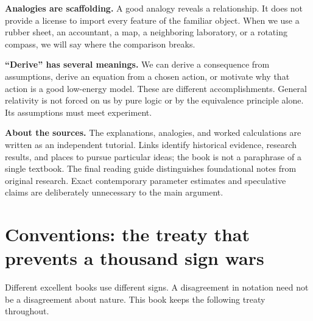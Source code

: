 \documentclass[
  11pt,
  letterpaper,
  oneside,
  openany]{scrbook}
\begin{document}
\endgroup

\textbf{Analogies are scaffolding.} A good analogy reveals a
relationship. It does not provide a license to import every feature of
the familiar object. When we use a rubber sheet, an accountant, a map, a
neighboring laboratory, or a rotating compass, we will say where the
comparison breaks.

\textbf{``Derive'' has several meanings.} We can derive a consequence
from assumptions, derive an equation from a chosen action, or motivate
why that action is a good low-energy model. These are different
accomplishments. General relativity is not forced on us by pure logic or
by the equivalence principle alone. Its assumptions must meet
experiment.

\textbf{About the sources.} The explanations, analogies, and worked
calculations are written as an independent tutorial. Links identify
historical evidence, research results, and places to pursue particular
ideas; the book is not a paraphrase of a single textbook. The final
reading guide distinguishes foundational notes from original research.
Exact contemporary parameter estimates and speculative claims are
deliberately unnecessary to the main argument.

\hypertarget{conventions-the-treaty-that-prevents-a-thousand-sign-wars}{%
\chapter{Conventions: the treaty that prevents a thousand sign
wars}\label{conventions-the-treaty-that-prevents-a-thousand-sign-wars}}

Different excellent books use different signs. A disagreement in
notation need not be a disagreement about nature. This book keeps the
following treaty throughout.

\begingroup\small\setlength{\tabcolsep}{5pt}\renewcommand{\arraystretch}{1.13}
\end{document}
